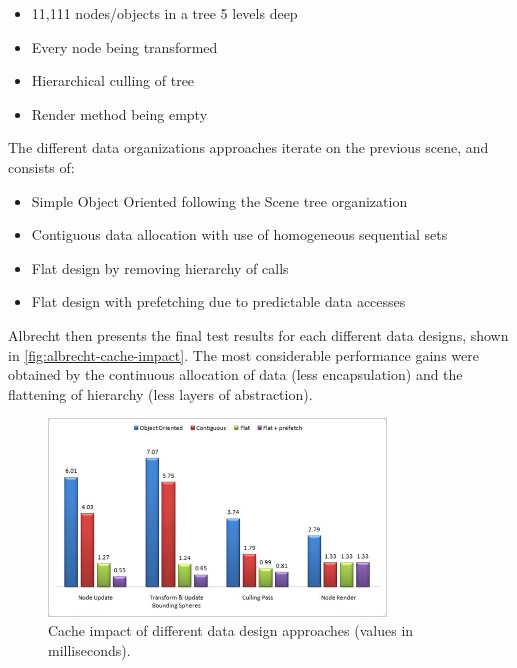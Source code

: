     \begin{itemize}
        \item 11,111 nodes/objects in a tree 5 levels deep
        \item Every node being transformed
        \item Hierarchical culling of tree
        \item Render method being empty
    \end{itemize}
    
    The different data organizations approaches iterate on the previous scene, and consists of:
    
    \begin{itemize}
        \item Simple Object Oriented following the Scene tree organization
        \item Contiguous data allocation with use of homogeneous sequential sets
        \item Flat design by removing hierarchy of calls
        \item Flat design with prefetching due to predictable data accesses
    \end{itemize}
    
    Albrecht then presents the final test results for each different data designs, shown in \autoref{fig:albrecht-cache-impact}. The most considerable performance gains were obtained by the continuous allocation of data (less encapsulation) and the flattening of hierarchy (less layers of abstraction).  
    
    \begin{figure}[H]
        \caption{
        \label{fig:albrecht-cache-impact}
            Cache impact of different data design approaches (values in milliseconds).
        }
        \begin{center}
        \includegraphics[width=0.8\textwidth]{images/albrecht-cache-impact.jpg}
        \end{center}
    \end{figure}
    
